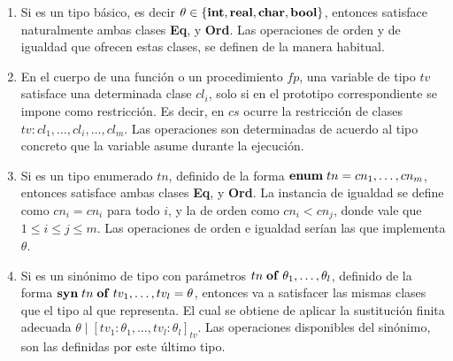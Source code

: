 \begin{enumerate}
\item Si es un tipo básico, es decir $\theta \in \{ \mathbf{int}, \mathbf{real}, \mathbf{char}, \mathbf{bool} \}$, entonces satisface naturalmente ambas clases \textbf{Eq}, y \textbf{Ord}.
Las operaciones de orden y de igualdad que ofrecen estas clases, se definen de la manera habitual.
\item En el cuerpo de una función o un procedimiento $fp$, una variable de tipo $tv$ satisface una determinada clase $cl_{i}$, solo si en el prototipo correspondiente se impone como restricción.
Es decir, en $cs$ ocurre la restricción de clases $tv : cl_1, \ldots, cl_{i}, \ldots, cl_m$.
Las operaciones son determinadas de acuerdo al tipo concreto que la variable asume durante la ejecución.
\item Si es un tipo enumerado $tn$, definido de la forma $\mathbf{enum} \; tn = cn_1, \ldots, cn_m$, entonces satisface ambas clases \textbf{Eq}, y \textbf{Ord}.
La instancia de igualdad se define como $cn_i = cn_i$ para todo $i$, y la de orden como $cn_i < cn_{j}$, donde vale que $1 \leq i \leq j \leq m$.
Las operaciones de orden e igualdad serían las que implementa $\theta$.
\item Si es un sinónimo de tipo con parámetros $tn \; \mathbf{of} \; \theta_1, \ldots, \theta_l$, definido de la forma $\mathbf{syn} \; tn \; \mathbf{of} \allowbreak \; tv_1, \dots, tv_l = \theta$, entonces va a satisfacer las mismas clases que el tipo al que representa.
El cual se obtiene de aplicar la sustitución finita adecuada $\theta \mid [tv_1 : \theta_1, \ldots, tv_l : \theta_l]_{tv}$.
Las operaciones disponibles del sinónimo, son las definidas por este último tipo.

\end{enumerate}
